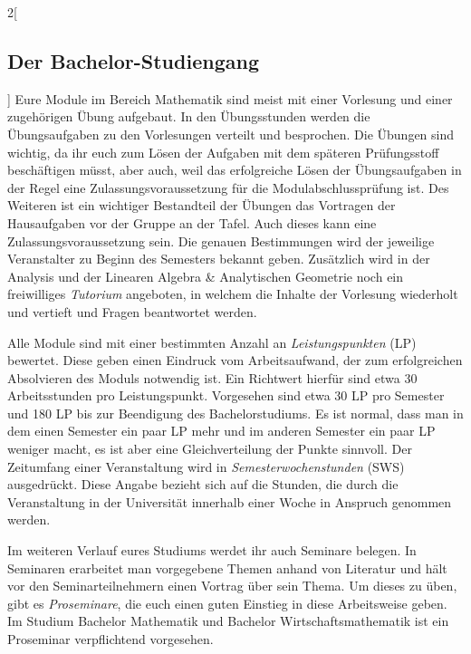 \begin{multicols}{2}[\subsection{Der Bachelor-Studiengang}]
Eure Module im Bereich Mathematik sind meist mit einer Vorlesung und einer
zugehörigen Übung aufgebaut.  In den Übungsstunden werden die Übungsaufgaben zu
den Vorlesungen verteilt und besprochen.  Die Übungen sind wichtig, da ihr euch
zum Lösen der Aufgaben mit dem späteren Prüfungsstoff beschäftigen müsst, aber
auch, weil das erfolgreiche Lösen der Übungsaufgaben in der Regel eine
Zulassungsvoraussetzung für die Modulabschlussprüfung ist.  Des Weiteren ist
ein wichtiger Bestandteil der Übungen das Vortragen der Hausaufgaben vor der
Gruppe an der Tafel.  Auch dieses kann eine Zulassungsvoraussetzung sein. Die
genauen Bestimmungen wird der jeweilige Veranstalter zu Beginn des Semesters
bekannt geben.  Zusätzlich wird in der Analysis und der Linearen Algebra \&
Analytischen Geometrie noch ein freiwilliges \emph{Tutorium} angeboten, in
welchem die Inhalte der Vorlesung wiederholt und vertieft und Fragen
beantwortet werden.


Alle Module sind mit einer bestimmten Anzahl an \emph{Leistungspunkten} (LP)
bewertet. Diese geben einen Eindruck vom Arbeitsaufwand, der zum erfolgreichen
Absolvieren des Moduls notwendig ist. Ein Richtwert hierfür sind etwa 30
Arbeitsstunden pro Leistungspunkt.  Vorgesehen sind etwa 30 LP pro Semester und
180 LP bis zur Beendigung des Bachelorstudiums.  Es ist normal, dass man in dem
einen Semester ein paar LP mehr und im anderen Semester ein paar LP weniger
macht, es ist aber eine Gleichverteilung der Punkte sinnvoll.  Der Zeitumfang
einer Veranstaltung wird in \emph{Semesterwochenstunden} (SWS) ausgedrückt.
Diese Angabe bezieht sich auf die Stunden, die durch die Veranstaltung in der
Universität innerhalb einer Woche in Anspruch genommen werden.

Im weiteren Verlauf eures Studiums werdet ihr auch Seminare belegen.  In
Seminaren erarbeitet man vorgegebene Themen anhand von Literatur und hält vor
den Seminarteilnehmern einen Vortrag über sein Thema.  Um dieses zu üben, gibt
es \emph{Proseminare}, die euch einen guten Einstieg in diese Arbeitsweise
geben. Im Studium Bachelor Mathematik und Bachelor Wirtschaftsmathematik ist
ein Proseminar verpflichtend vorgesehen. 
\end{multicols}

\clearpage
